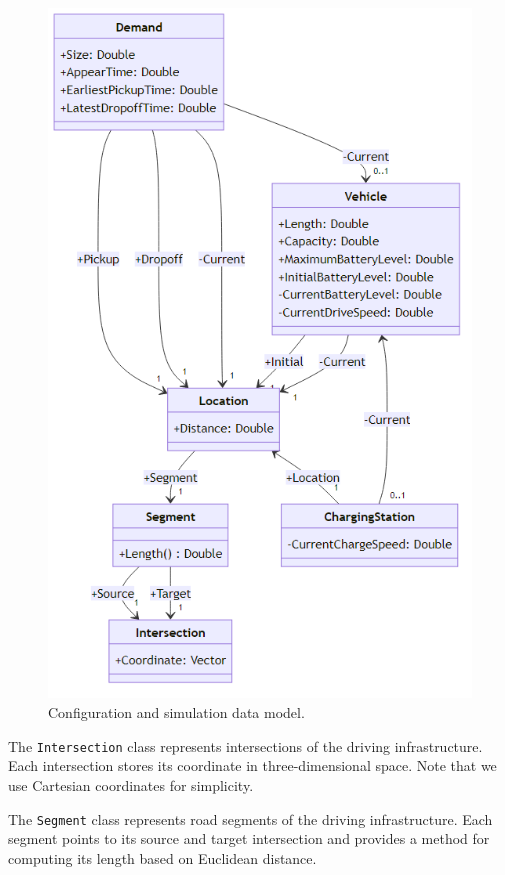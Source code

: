 \documentclass[a4paper,twoside]{article}
\begin{document}
	\begin{figure}[!ht]
		\centering
		\includegraphics[scale=0.30]{./graphics/interfaces/model.png}
		\caption{Configuration and simulation data model.}
		\label{fig:data-model}
	\end{figure}
	
	The \texttt{Intersection} class represents intersections of the driving infrastructure.
	Each intersection stores its coordinate in three-dimensional space.
	Note that we use Cartesian coordinates for simplicity.
	
	The \texttt{Segment} class represents road segments of the driving infrastructure.
	Each segment points to its source and target intersection and provides a method for computing its length based on Euclidean distance.
	
\end{document}

